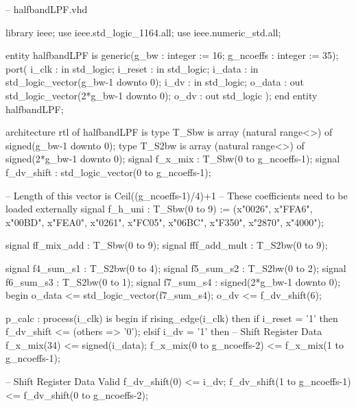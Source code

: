 \begin{VHDLlisting}[tabsize=2]
-- halfbandLPF.vhd

library ieee;
    use ieee.std_logic_1164.all;
    use ieee.numeric_std.all;
	
entity halfbandLPF is 
    generic(g_bw       : integer := 16;
            g_ncoeffs  : integer := 35);
    port(
            i_clk      : in    std_logic;
            i_reset    : in    std_logic;
            i_data     : in    std_logic_vector(g_bw-1 downto 0);
            i_dv       : in    std_logic;
            o_data     :   out std_logic_vector(2*g_bw-1 downto 0);
            o_dv       :   out std_logic	
    );
end entity halfbandLPF;

architecture rtl of halfbandLPF is 
    type T_Sbw is array (natural range<>) of signed(g_bw-1 downto 0);
    type T_S2bw is array (natural range<>) of signed(2*g_bw-1 downto 0);
    signal f_x_mix    : T_Sbw(0 to g_ncoeffs-1);
    signal f_dv_shift : std_logic_vector(0 to g_ncoeffs-1);
	
    -- Length of this vector is Ceil((g_ncoeffs-1)/4)+1
    -- These coefficients need to be loaded externally
    signal f_h_uni      : T_Sbw(0 to 9) := (x"0026",
                                            x"FFA6",
                                            x"00BD",
                                            x"FEA0",
                                            x"0261",
                                            x"FC05",
                                            x"06BC",
                                            x"F350",
                                            x"2870",
                                            x"4000");

    signal ff_mix_add   : T_Sbw(0 to 9);
    signal fff_add_mult : T_S2bw(0 to 9);
	
    signal f4_sum_s1    : T_S2bw(0 to 4);
    signal f5_sum_s2    : T_S2bw(0 to 2);
    signal f6_sum_s3    : T_S2bw(0 to 1);
    signal f7_sum_s4    : signed(2*g_bw-1 downto 0);
begin
    o_data <= std_logic_vector(f7_sum_s4);
    o_dv <= f_dv_shift(6);

    p_calc : process(i_clk) is
    begin
        if rising_edge(i_clk) then
            if i_reset = '1' then
                f_dv_shift <= (others => '0');
            elsif i_dv = '1' then
                -- Shift Register Data
                f_x_mix(34) <= signed(i_data);
                f_x_mix(0 to g_ncoeffs-2) <= f_x_mix(1 to g_ncoeffs-1);
				
                -- Shift Register Data Valid
                f_dv_shift(0) <= i_dv;
                f_dv_shift(1 to g_ncoeffs-1) <= f_dv_shift(0 to g_ncoeffs-2);
				

\end{VHDLlisting}
